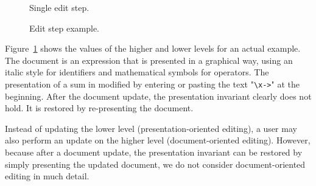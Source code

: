 \begin{figure}[h]
  \hfill
  \begin{minipage}[b]{.45\textwidth}
    \begin{center}   
      \caption{Single edit step.} \label{singleLayerEdit}
    \end{center}
  \end{minipage}
  \hfill
  \begin{minipage}[b]{.45\textwidth}
    \begin{center}  
      \caption{Edit step example.} \label{singleLayerEditExample}
    \end{center}
  \end{minipage}
  \hfill
\end{figure}

%


Figure~\ref{singleLayerEditExample} shows the values of the higher and lower levels for an actual example. The document is an expression that is presented in a graphical way, using an italic style for identifiers and mathematical symbols for operators. The presentation of a sum in modified by entering or pasting the text "\verb|\x->|" at the beginning. After the document update, the presentation invariant clearly does not hold. It is restored by re-presenting the document.

Instead of updating the lower level (presentation-oriented editing), a user may also perform an update on the higher level (document-oriented editing). However, because after a document update, the presentation invariant can be restored by simply presenting the updated document, we do not consider document-oriented editing in much detail.


